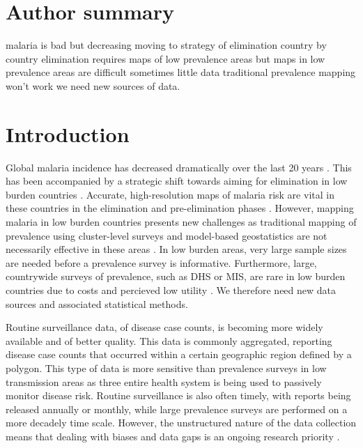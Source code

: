 \documentclass[10pt,letterpaper]{article}
\begin{document}
\section*{Author summary}
malaria is bad but decreasing
moving to strategy of elimination country by country
elimination requires maps of low prevalence areas
but maps in low prevalence areas are difficult
sometimes little data
traditional prevalence mapping won't work
we need new sources of data.


\linenumbers

\section*{Introduction}

Global malaria incidence has decreased dramatically over the last 20 years \cite{abajobir2017global}.
This has been accompanied by a strategic shift towards aiming for elimination in low burden countries \cite{world2016world}.
Accurate, high-resolution maps of malaria risk are vital in these countries in the elimination and pre-elimination phases \cite{sturrock2016mapping}.
However, mapping malaria in low burden countries presents new challenges as traditional mapping of prevalence using cluster-level surveys and model-based geostatistics are not necessarily effective in these areas \cite {sturrock2016mapping, sturrock2014fine}.
In low burden areas, very large sample sizes are needed before a prevalence survey is informative.
Furthermore, large, countrywide surveys of prevalence, such as DHS or MIS, are rare in low burden countries due to costs and percieved low utility \cite{dunno}.
We therefore need new data sources and associated statistical methods.

Routine surveillance data, of disease case counts, is becoming more widely available and of better quality.
This data is commonly aggregated, reporting disease case counts that occurred within a certain geographic region defined by a polygon.
This type of data is more sensitive than prevalence surveys in low transmission areas as three entire health system is being used to passively monitor disease risk.
Routine surveillance is also often timely, with reports being released annually or monthly, while large prevalence surveys are performed on a more decadely time scale.
However, the unstructured nature of the data collection means that dealing with biases and data gaps is an ongoing research priority \cite{battle2016treatment, cibulskis2011worldwide}.
\end{document}
